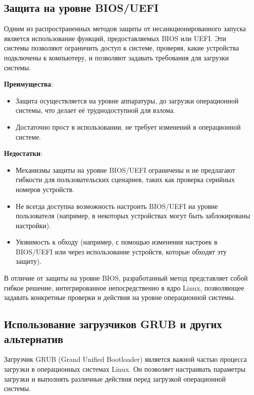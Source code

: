 \documentclass[12pt]{article}
\begin{document}
\subsection*{Защита на уровне BIOS/UEFI}

Одним из распространенных методов защиты от несанкционированного запуска является использование функций, предоставляемых BIOS или UEFI. Эти системы позволяют ограничить доступ к системе, проверяя, какие устройства подключены к компьютеру, и позволяют задавать требования для загрузки системы.

\textbf{Преимущества}:
\begin{itemize}
    \item Защита осуществляется на уровне аппаратуры, до загрузки операционной системы, что делает её труднодоступной для взлома.
    \item Достаточно прост в использовании, не требует изменений в операционной системе.
\end{itemize}

\newpage

\textbf{Недостатки}:
\begin{itemize}
    \item Механизмы защиты на уровне BIOS/UEFI ограничены и не предлагают гибкости для пользовательских сценариев, таких как проверка серийных номеров устройств.
    \item Не всегда доступна возможность настроить BIOS/UEFI на уровне пользователя (например, в некоторых устройствах могут быть заблокированы настройки).
    \item Уязвимость к обходу (например, с помощью изменения настроек в BIOS/UEFI или через использование устройств, которые обходят эту защиту).
\end{itemize}

В отличие от защиты на уровне BIOS, разработанный метод представляет собой гибкое решение, интегрированное непосредственно в ядро Linux, позволяющее задавать конкретные проверки и действия на уровне операционной системы.

\subsection*{Использование загрузчиков GRUB и других альтернатив}

Загрузчик GRUB (Grand Unified Bootloader) является важной частью процесса загрузки в операционных системах Linux. Он позволяет настраивать параметры загрузки и выполнять различные действия перед загрузкой операционной системы.
\end{document}
